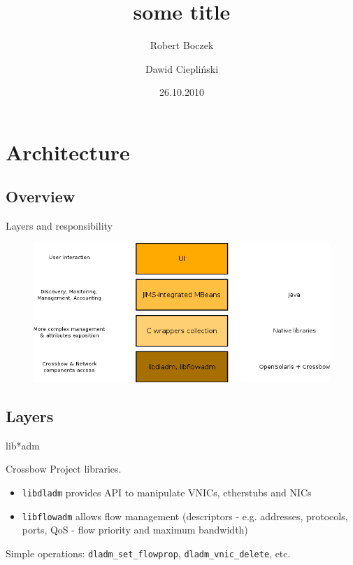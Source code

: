 \documentclass{beamer}
\title{some title}
\author{Robert Boczek \and Dawid Ciepliński}
\date{26.10.2010}
\begin{document}
\begin{frame}

	\titlepage

\end{frame}


\section{Architecture}

	\subsection{Overview}

		\begin{frame}{Layers and responsibility}

			\begin{figure}[H]
				\includegraphics[width=\textwidth]{img/layers.png}
			\end{figure}
			
		\end{frame}
	

	\subsection{Layers}

		\begin{frame}{lib*adm}

			Crossbow Project libraries.

			\begin{itemize}
				\item \texttt{libdladm} provides API to manipulate VNICs, etherstubs and NICs
				\item \texttt{libflowadm} allows flow management (descriptors - e.g. addresses, protocols, ports, QoS - flow priority and maximum bandwidth)
			\end{itemize}

			Simple operations: \texttt{dladm\_set\_flowprop}, \texttt{dladm\_vnic\_delete}, etc.

		\end{frame}
	
\end{document}
